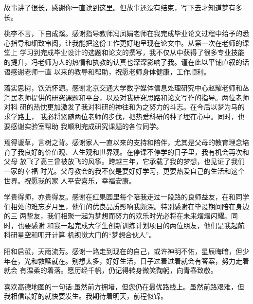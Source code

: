\begin{thanks}
故事讲了很长，感谢你一直读到这里。但故事还没有结束，写下去才知道梦有多长。

桃李不言，下自成蹊。感谢指导教师冯凤娟老师在我完成毕业论文过程中给予的悉 心指导和细致审阅，让我能把这份工作更好地呈现在论文中。从第一次在老师的课堂上 学习到完成毕业设计的选题和论文的撰写，我不仅从中获得了很多专业技能的提升，冯老师为人的热情和执教的认真也深深影响了我。谨在此以平铺直叙的话语感谢老师一直 以来的教导和帮助，祝愿老师身体健康，工作顺利。

落实思树，饮流怀源。感谢北京交通大学数字媒体信息处理研究中心赵耀老师和丛 润民老师提供的研究课题和平台，以及对我研究思路和论文写作的指导。两位老师对科 研的热忱更加激发了我对科研的神往和为之努力的斗志。在今后以梦为马的求学路上， 我必将紧随两位老师的步伐，把热爱科研的种子埋在心中。同时，也要感谢实验室帮助 我顺利完成研究课题的各位同学。

焉得谖草，言树之背。感谢家人一直以来的支持和陪伴，尤其是父母的教育理念培 育了我良好的价值观、人生观和世界观。在停课不停学的日子里，我有机会再次和父母 放飞了高三曾被放飞的风筝。跨越三年，它承载了我的梦想，也见证了我们一家的幸福 时光。父母教会的我不仅是要好好学习，更要热爱自己的生活和这个世界。祝愿我的家 人平安喜乐，幸福安康。

学贵得师，亦贵得友。感谢在红果园里每个陪我走过一段路的良师益友，在和同学 们相处的难忘岁月里，他们的优良品质影响我颇深。特别感谢在毕设期间陪在身边的三 两挚友，我们相聚一起为梦想而努力的欢乐时光必将在未来熠熠闪耀。同时，也要感谢 和我一起完成大学生创新训练计划项目的两位朋友，他们是我起航科研星空和叩开计算 机视觉大门的“梦想合伙人”。

阳和启蜇，天雨流芳。感谢一路走到现在的自己，或许神明不佑，星辰晦暗，但少 年在，光和救赎就在。别想太多，好好生活，日子过着过着就会有答案，努力走着就会 有温柔的着落。愿历经千帆，仍记得转身微笑鞠躬，向青春致敬。

喜欢高德地图的一句话:虽然前方拥堵，但您仍在最优路线上。虽然前路艰难，但 我相信最好的就快要发生。我期待着明天，前程似锦。
\end{thanks}